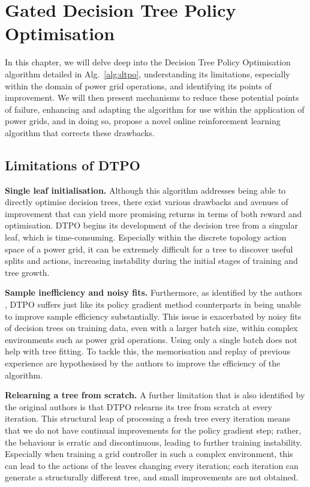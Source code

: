 \chapter{Gated Decision Tree Policy Optimisation}
\label{ch:gdtpo}

In this chapter, we will delve deep into the Decision Tree Policy Optimisation algorithm detailed in Alg.~\ref{alg:dtpo}, understanding its limitations, especially within the domain of power grid operations, and identifying its points of improvement. We will then present mechanisms to reduce these potential points of failure, enhancing and adapting the algorithm for use within the application of power grids, and in doing so, propose a novel online reinforcement learning algorithm that corrects these drawbacks.

\section{Limitations of DTPO}

\textbf{Single leaf initialisation.} Although this algorithm addresses being able to directly optimise decision trees, there exist various drawbacks and avenues of improvement that can yield more promising returns in terms of both reward and optimisation. DTPO begins its development of the decision tree from a singular leaf, which is time-consuming. Especially within the discrete topology action space of a power grid, it can be extremely difficult for a tree to discover useful splits and actions, increasing instability during the initial stages of training and tree growth. 

\textbf{Sample inefficiency and noisy fits.} Furthermore, as identified by the authors \cite{vos2024optimizing}, DTPO suffers just like its policy gradient method counterparts in being unable to improve sample efficiency substantially. This issue is exacerbated by noisy fits of decision trees on training data, even with a larger batch size, within complex environments such as power grid operations. Using only a single batch does not help with tree fitting. To tackle this, the memorisation and replay of previous experience are hypothesised by the authors to improve the efficiency of the algorithm. 

\textbf{Relearning a tree from scratch.} A further limitation that is also identified by the original authors is that DTPO relearns its tree from scratch at every iteration. This structural leap of processing a fresh tree every iteration means that we do not have continual improvements for the policy gradient step; rather, the behaviour is erratic and discontinuous, leading to further training instability. Especially when training a grid controller in such a complex environment, this can lead to the actions of the leaves changing every iteration; each iteration can generate a structurally different tree, and small improvements are not obtained.

